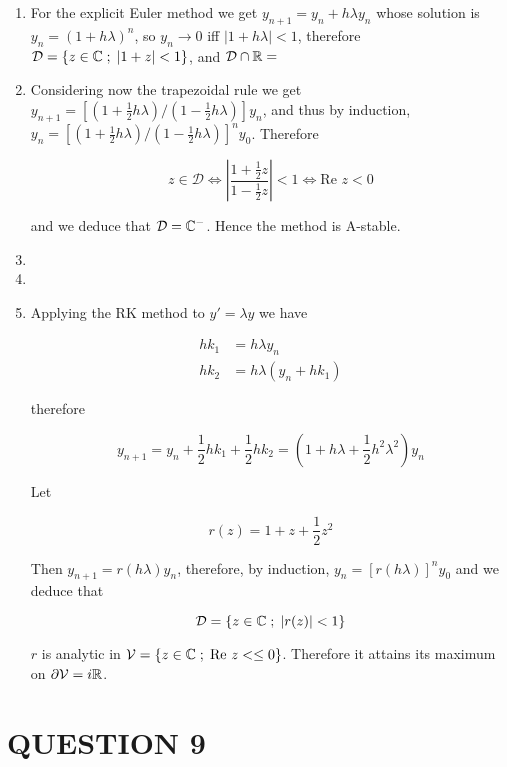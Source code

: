 \documentclass[a4paper]{article}
\begin{document}
\begin{enumerate}
	\item For the explicit Euler method we get $ y_{n+1} = y_{n} + h \lambda y_{n} $ whose solution is $ y_{n} = (1+ h \lambda)^{n} $, so $ y_{n} \to 0 $ iff $ | 1 + h \lambda | < 1 $, therefore $ \mathcal{D} = \{ z \in \mathbb{C} \; ; \; | 1 + z | < 1  \} $, and $ \mathcal{D} \cap \mathbb{R} =  $
	
	\item Considering now the trapezoidal rule we get $ y_{n+1} = [  (1+\frac{1}{2} h \lambda) / (1 - \frac{1}{2} h \lambda) ] y_{n} $, and thus by induction, $ y_{n} = [  (1+\frac{1}{2} h \lambda) / (1 - \frac{1}{2} h \lambda) ]^{n} y_{0} $. Therefore
	
	\[ z \in \mathcal{D} \iff \left| \frac{1+\frac{1}{2}z}{1 - \frac{1}{2} z} \right| < 1 \iff \text{Re } z < 0  \]
	
	and we deduce that $ \mathcal{D} = \mathbb{C}^{-} $. Hence the method is A-stable. 
	
	\item 
	
	\item 
	
	\item Applying the RK method to $ y' = \lambda y $ we have
	
	\begin{align*}
	h k_{1} & = h \lambda y_{n} \\
	h k_{2} & = h \lambda ( y_{n} + h k_{1}) 
	\end{align*}
	
	therefore
	
	\[ y_{n+1} = y_{n} + \frac{1}{2} h k_{1} + \frac{1}{2} h k_{2} = (1+ h \lambda  + \frac{1}{2} h^{2} \lambda^{2} ) y_{n}    \]
	
	Let 
	
	\[ r(z) = 1 + z + \frac{1}{2} z^{2}  \]
	
	Then $ y_{n+1} = r(h \lambda) y_{n} $, therefore, by induction, $ y_{n} = [r(h \lambda)]^{n} y_{0} $ and we deduce that 
	
	\[ \mathcal{D} = \{  z \in \mathbb{C} \; ; \; | r(z) | < 1 \} \]
	
	$ r $ is analytic in $ \mathcal{V} = \{  z \in \mathbb{C} \; ; \; \text{Re } z < \leq 0 \} $. Therefore it attains its maximum on $ \partial \mathcal{V} = i \mathbb{R} $. 
	
\end{enumerate}

\section{QUESTION 9}
\end{document}
